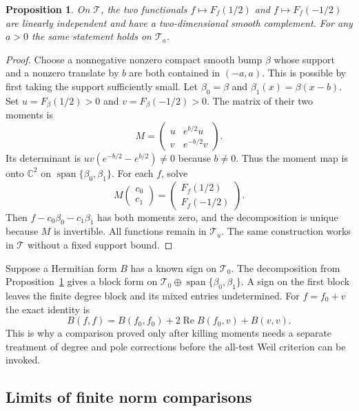 \documentclass[11pt,letterpaper]{article}
\newtheorem{proposition}[theorem]{Proposition}
\theoremstyle{definition}
\theoremstyle{remark}
\newcommand{\C}{\mathbb C}
\newcommand{\T}{\mathcal T}
\newcommand{\Span}{\operatorname{span}}
\begin{document}
\begin{proposition}
\label{prop:moment-complement}
On $\T$, the two functionals $f\mapsto F_f(1/2)$ and
$f\mapsto F_f(-1/2)$ are linearly independent and have
a two-dimensional smooth complement. For any $a>0$ the
same statement holds on $\T_a$.
\end{proposition}
\begin{proof}
Choose a nonnegative nonzero compact smooth bump $\beta$
whose support and a nonzero translate by $b$ are both
contained in $(-a,a)$. This is possible by first taking
the support sufficiently small. Let $\beta_0=\beta$ and
$\beta_1(x)=\beta(x-b)$. Set
$u=F_\beta(1/2)>0$ and $v=F_\beta(-1/2)>0$.
The matrix of their two moments is
\begin{equation}
 M=\begin{pmatrix}u&e^{b/2}u\\v&e^{-b/2}v\end{pmatrix}.
 \label{eq:moment-matrix}
\end{equation}
Its determinant is $uv(e^{-b/2}-e^{b/2})\ne0$ because
$b\ne0$. Thus the moment map is onto $\C^2$ on
$\Span\{\beta_0,\beta_1\}$. For each $f$, solve
\[
 M\begin{pmatrix}c_0\\c_1\end{pmatrix}
 =\begin{pmatrix}F_f(1/2)\\F_f(-1/2)\end{pmatrix}.
\]
Then $f-c_0\beta_0-c_1\beta_1$ has both moments zero,
and the decomposition is unique because $M$ is invertible.
All functions remain in $\T_a$. The same construction
works in $\T$ without a fixed support bound.
\end{proof}

Suppose a Hermitian form $B$ has a known sign on $\T_0$.
The decomposition from Proposition~\ref{prop:moment-complement}
gives a block form on
$\T_0\oplus\Span\{\beta_0,\beta_1\}$. A sign on the
first block leaves the finite degree block and its mixed
entries undetermined. For $f=f_0+v$ the exact identity is
\[
 B(f,f)=B(f_0,f_0)+2\operatorname{Re}B(f_0,v)+B(v,v).
\]
This is why a comparison proved only after killing moments
needs a separate treatment of degree and pole corrections
before the all-test Weil criterion can be invoked.

\subsection{Limits of finite norm comparisons}
\end{document}
